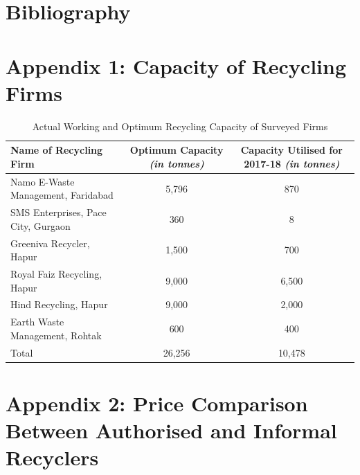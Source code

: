 \documentclass[a4paper, 12pt]{article}
\begin{document}
         
\section*{Bibliography}
\printbibliography[heading=none] 
	     
	      
\newpage      
\section*{Appendix 1: Capacity of Recycling Firms}
         
\begin{table}[htpb]
\raggedright
\caption{Actual Working and Optimum Recycling Capacity of Surveyed Firms}\begin{tabular}{ l  c  c }
\toprule
\multicolumn{1}{p{7em}}{\raggedright{Name of Recycling Firm}} & \multicolumn{1}{p{8.5em}}{Optimum Capacity \centering\footnotesize\textit{(in tonnes)}} & \multicolumn{1}{p{9.5em}}{Capacity Utilised for 2017-18 \centering\footnotesize\textit{(in tonnes)}} \\
\midrule

Namo E-Waste Management, Faridabad & 5,796 & 870 \\
SMS Enterprises, Pace City, Gurgaon & 360 & 8 \\
Greeniva Recycler, Hapur & 1,500 & 700 \\
Royal Faiz Recycling, Hapur & 9,000 & 6,500 \\
Hind Recycling, Hapur & 9,000 & 2,000 \\
Earth Waste Management, Rohtak & 600 & 400 \\
\midrule
Total & 26,256 & 10,478  \\ 
\bottomrule
\end{tabular}
\end{table}
      
        
\section*{Appendix 2: Price Comparison Between Authorised and Informal Recyclers}
       
\end{document}

